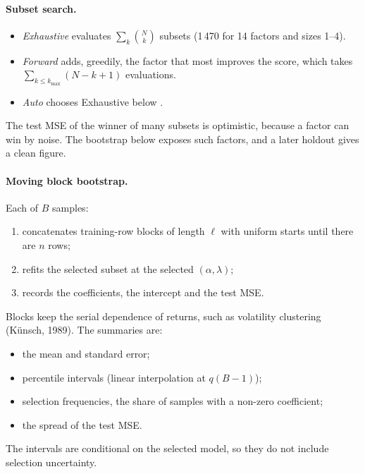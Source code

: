 \paragraph{Subset search.}
\begin{itemize}
  \item \emph{Exhaustive} evaluates $\sum_k\binom Nk$ subsets (1\,470 for 14 factors and
        sizes 1--4).
  \item \emph{Forward} adds, greedily, the factor that most improves the score, which takes
        $\sum_{k\le k_{\max}}(N-k+1)$ evaluations.
  \item \emph{Auto} chooses Exhaustive below .
\end{itemize}
The test MSE of the winner of many subsets is optimistic, because a factor can win by noise.
The bootstrap below exposes such factors, and a later holdout gives a clean figure.

\paragraph{Moving block bootstrap.} Each of $B$ samples:
\begin{enumerate}
  \item concatenates training-row blocks of length $\ell$ with uniform starts until there
        are $n$ rows;
  \item refits the selected subset at the selected $(\alpha,\lambda)$;
  \item records the coefficients, the intercept and the test MSE.
\end{enumerate}
Blocks keep the serial dependence of returns, such as volatility clustering (K\"unsch, 1989).
The summaries are:
\begin{itemize}
  \item the mean and standard error;
  \item percentile intervals (linear interpolation at $q(B-1)$);
  \item selection frequencies, the share of samples with a non-zero coefficient;
  \item the spread of the test MSE.
\end{itemize}
The intervals are conditional on the selected model, so they do not include selection
uncertainty.

